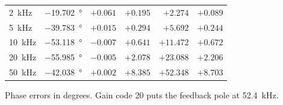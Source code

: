 {\begin{tabular}{lrrrrr}
    \SI{2}{\kilo\hertz}  & \SI{-19.702}{\degree} & \(+0.061\) & \(+0.195\) & \(+2.274\) & \(+0.089\) \\
    \SI{5}{\kilo\hertz}  & \SI{-39.783}{\degree} & \(+0.015\) & \(+0.294\) & \(+5.692\) & \(+0.244\) \\
    \SI{10}{\kilo\hertz} & \SI{-53.118}{\degree} & \(-0.007\) & \(+0.641\) & \(+11.472\) & \(+0.672\) \\
    \SI{20}{\kilo\hertz} & \SI{-55.985}{\degree} & \(-0.005\) & \(+2.078\) & \(+23.088\) & \(+2.206\) \\
    \SI{50}{\kilo\hertz} & \SI{-42.038}{\degree} & \(+0.002\) & \(+8.385\) & \(+52.348\) & \(+8.703\) \\
    \bottomrule
  \end{tabular}%
  \par\smallskip
  {\footnotesize Phase errors in degrees. Gain code 20 puts the feedback pole
  at \SI{52.4}{\kilo\hertz}.}%
}
\par\addvspace{\intextsep}
